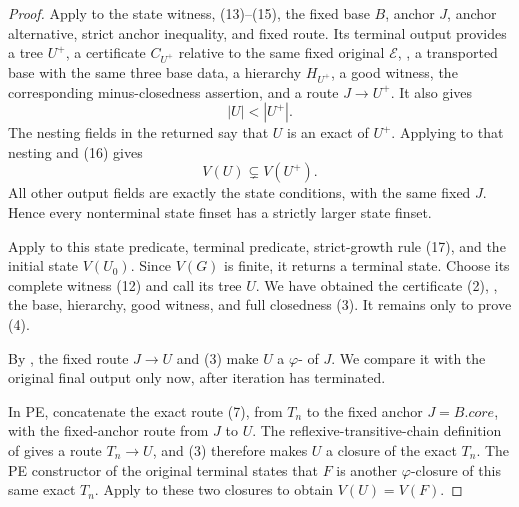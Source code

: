 \begin{proof}
Apply  to the state witness,
(13)--(15), the fixed base \(B\), anchor \(J\), anchor alternative, strict
anchor inequality, and fixed route.  Its terminal output provides a tree
\(U^+\), a certificate \(C_{U^+}\) relative to the same fixed original
\(\mathcal E\), , a transported base with the same three
base data, a hierarchy \(H_{U^+}\), a good witness, the corresponding
minus-closedness assertion, and a route
\(J\longrightarrow U^+\).  It also gives
\[
                              |U|<|U^+|.                         \tag{16}
\]
The nesting fields in the returned
 say that \(U\) is an exact
 of \(U^+\).  Applying
 to that nesting and
(16) gives
\[
                              V(U)\subsetneq V(U^+).              \tag{17}
\]
All other output fields are exactly the state conditions, with the same
fixed \(J\).  Hence every nonterminal state finset has a strictly larger
state finset.

Apply  to this state predicate,
terminal predicate, strict-growth rule (17), and the initial state
\(V(U_0)\).  Since \(V(G)\) is finite, it returns a terminal state.  Choose
its complete witness (12) and call its tree \(U\).  We have obtained the
certificate (2), , the base, hierarchy, good witness, and
full closedness (3).  It remains only to prove (4).

By , the fixed route
\(J\longrightarrow U\) and (3) make \(U\) a
\(\varphi\)- of \(J\).  We compare it with the
original final output only now, after iteration has terminated.

In PE, concatenate the exact route (7), from \(T_n\) to the fixed anchor
\(J=B.\mathit{core}\), with the fixed-anchor route from \(J\) to \(U\).
The reflexive-transitive-chain definition of
 gives a route
\(T_n\longrightarrow U\), and (3) therefore makes \(U\) a closure of the
exact \(T_n\).  The PE constructor of the original terminal
 states that \(F\) is another
\(\varphi\)-closure of this same exact \(T_n\).  Apply
 to these two closures to obtain
\(V(U)=V(F)\).


\end{proof}
